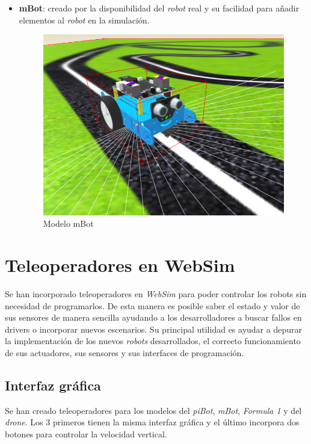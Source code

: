 \begin{itemize}
  \item \textbf{mBot}: creado por la disponibilidad del \textit{robot} real y su facilidad para añadir elementos al \textit{robot} en la simulación.
    \begin{figure}[H]
    \centering            
    \includegraphics[scale=0.25]{img/mBot_model.png}
    \caption{Modelo mBot} \label{fig:mBot}
    \end{figure}
    
\end{itemize}

\section{Teleoperadores en WebSim}
\label{sec:teleoperadores}

Se han incorporado teleoperadores en \textit{WebSim} para poder controlar los robots sin necesidad de programarlos. De esta manera es posible saber el estado y valor de sus sensores de manera sencilla ayudando a los desarrolladores a buscar fallos en drivers o incorporar nuevos escenarios. 
Su principal utilidad es ayudar a depurar la implementación de los nuevos \textit{robots} desarrollados, el correcto funcionamiento de sus actuadores, sus sensores y sus interfaces de programación. 

\subsection{Interfaz gráfica}

Se han creado teleoperadores para los modelos del \textit{piBot}, \textit{mBot}, \textit{Formula 1} y del \textit{drone}. Los 3 primeros tienen la misma interfaz gráfica y el último incorpora dos botones para controlar la velocidad vertical. 


